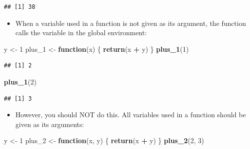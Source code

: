 \documentclass[]{book}
\newenvironment{Shaded}{\begin{snugshade}}{\end{snugshade}}
\newcommand{\KeywordTok}[1]{\textcolor[rgb]{0.13,0.29,0.53}{\textbf{#1}}}
\newcommand{\DecValTok}[1]{\textcolor[rgb]{0.00,0.00,0.81}{#1}}
\newcommand{\StringTok}[1]{\textcolor[rgb]{0.31,0.60,0.02}{#1}}
\newcommand{\ControlFlowTok}[1]{\textcolor[rgb]{0.13,0.29,0.53}{\textbf{#1}}}
\newcommand{\OperatorTok}[1]{\textcolor[rgb]{0.81,0.36,0.00}{\textbf{#1}}}
\newcommand{\NormalTok}[1]{#1}
\providecommand{\tightlist}{%
  \setlength{\itemsep}{0pt}\setlength{\parskip}{0pt}}
\begin{document}
\begin{verbatim}
## [1] 38
\end{verbatim}

\begin{itemize}
\tightlist
\item
  When a variable used in a function is not given as its argument, the
  function calls the variable in the global environment:
\end{itemize}

\begin{Shaded}
\begin{Highlighting}[]
\NormalTok{y <-}\StringTok{ }\DecValTok{1}
\NormalTok{plus_}\DecValTok{1}\NormalTok{ <-}\StringTok{ }\ControlFlowTok{function}\NormalTok{(x) \{}
  \KeywordTok{return}\NormalTok{(x }\OperatorTok{+}\StringTok{ }\NormalTok{y)}
\NormalTok{\}}
\KeywordTok{plus_1}\NormalTok{(}\DecValTok{1}\NormalTok{)}
\end{Highlighting}
\end{Shaded}

\begin{verbatim}
## [1] 2
\end{verbatim}

\begin{Shaded}
\begin{Highlighting}[]
\KeywordTok{plus_1}\NormalTok{(}\DecValTok{2}\NormalTok{)}
\end{Highlighting}
\end{Shaded}

\begin{verbatim}
## [1] 3
\end{verbatim}

\begin{itemize}
\tightlist
\item
  However, you should NOT do this. All variables used in a function
  should be given as its arguments:
\end{itemize}

\begin{Shaded}
\begin{Highlighting}[]
\NormalTok{y <-}\StringTok{ }\DecValTok{1}
\NormalTok{plus_}\DecValTok{2}\NormalTok{ <-}\StringTok{ }\ControlFlowTok{function}\NormalTok{(x, y) \{}
  \KeywordTok{return}\NormalTok{(x }\OperatorTok{+}\StringTok{ }\NormalTok{y)}
\NormalTok{\}}
\KeywordTok{plus_2}\NormalTok{(}\DecValTok{2}\NormalTok{, }\DecValTok{3}\NormalTok{)}
\end{Highlighting}
\end{Shaded}
\end{document}
